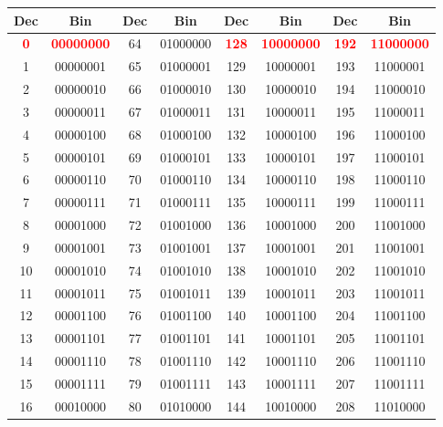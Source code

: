 \documentclass[a4paper,12pt]{report}
\renewcommand{\arraystretch}{1.2} %
\begin{document}
{ %
\renewcommand{\arraystretch}{0.95} %
\scriptsize %
\setlength{\tabcolsep}{4pt} %

\begin{center}
\begin{tabular}{|c|c||c|c||c|c||c|c|}
\hline
\textbf{Dec} & \textbf{Bin} & \textbf{Dec} & \textbf{Bin} & \textbf{Dec} & \textbf{Bin} & \textbf{Dec} & \textbf{Bin} \\ 
\hline

\textbf{\textcolor{red}{0}} & \textbf{\textcolor{red}{00000000}} & 64 & 01000000 & \textbf{\textcolor{red}{128}} & \textbf{\textcolor{red}{10000000}} & \textbf{\textcolor{red}{192}} & \textbf{\textcolor{red}{11000000}} \\
1 & 00000001 & 65 & 01000001 & 129 & 10000001 & 193 & 11000001 \\
2 & 00000010 & 66 & 01000010 & 130 & 10000010 & 194 & 11000010 \\
3 & 00000011 & 67 & 01000011 & 131 & 10000011 & 195 & 11000011 \\
4 & 00000100 & 68 & 01000100 & 132 & 10000100 & 196 & 11000100 \\
5 & 00000101 & 69 & 01000101 & 133 & 10000101 & 197 & 11000101 \\
6 & 00000110 & 70 & 01000110 & 134 & 10000110 & 198 & 11000110 \\
7 & 00000111 & 71 & 01000111 & 135 & 10000111 & 199 & 11000111 \\
8 & 00001000 & 72 & 01001000 & 136 & 10001000 & 200 & 11001000 \\
9 & 00001001 & 73 & 01001001 & 137 & 10001001 & 201 & 11001001 \\
10 & 00001010 & 74 & 01001010 & 138 & 10001010 & 202 & 11001010 \\
11 & 00001011 & 75 & 01001011 & 139 & 10001011 & 203 & 11001011 \\
12 & 00001100 & 76 & 01001100 & 140 & 10001100 & 204 & 11001100 \\
13 & 00001101 & 77 & 01001101 & 141 & 10001101 & 205 & 11001101 \\
14 & 00001110 & 78 & 01001110 & 142 & 10001110 & 206 & 11001110 \\
15 & 00001111 & 79 & 01001111 & 143 & 10001111 & 207 & 11001111 \\
16 & 00010000 & 80 & 01010000 & 144 & 10010000 & 208 & 11010000 \\

\end{tabular}
\end{center}}
\end{document}
